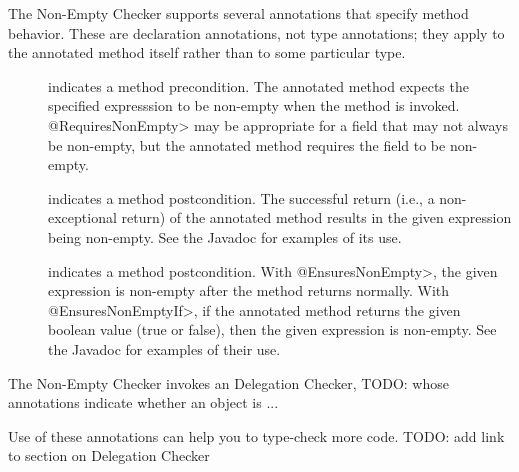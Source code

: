 The Non-Empty Checker supports several annotations that specify method
behavior.  These are declaration annotations, not type annotations;  they
apply to the annotated method itself rather than to some particular type.

\begin{description}

\item[]
  indicates a method precondition.  The annotated method expects the
  specified expresssion to be non-empty when the
  method is invoked. \<@RequiresNonEmpty> may be appropriate for
  a field that may not always be non-empty, but the annotated method requires
  the field to be non-empty.

\item[]
  indicates a method postcondition. The successful return (i.e., a
  non-exceptional return) of the annotated method results in the given
  expression being non-empty. See the Javadoc for examples of its use.

\item[]
  indicates a method postcondition.  With \<@EnsuresNonEmpty>, the given
  expression is non-empty after the method returns normally.  With
  \<@EnsuresNonEmptyIf>, if the annotated
  method returns the given boolean value (true or false), then the given
  expression is non-empty. See the Javadoc for examples of their use.

\end{description}


The Non-Empty Checker invokes an Delegation Checker,
TODO: whose annotations indicate whether an object is ...

\begin{description}
\item[]
\item[]
\item[]
\end{description}

\noindent
Use of these annotations can help you to type-check more code.
TODO: add link to section on Delegation Checker


